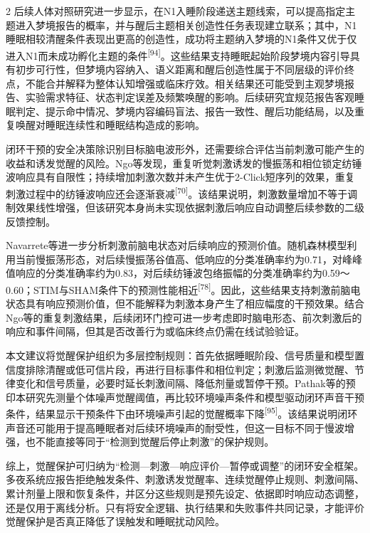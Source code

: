 \documentclass[UTF8,zihao=5,fontset=none]{ctexart}
\newcommand{\hei}{\CJKfamily{hei}}
\newcommand{\leveltwo}[1]{%
  \par\noindent{\hei\fontsize{10.5pt}{15.6pt}\selectfont\bfseries #1\par}}
\newcommand{\refcite}[1]{\nolinebreak[4]\textsuperscript{[#1]}}
\begin{document}
\begin{multicols}{2}
后续人体对照研究进一步显示，在N1入睡阶段递送主题线索，可以提高指定主题进入梦境报告的概率，并与醒后主题相关创造性任务表现建立联系；其中，N1睡眠相较清醒条件表现出更高的创造性，成功将主题纳入梦境的N1条件又优于仅进入N1而未成功孵化主题的条件\refcite{94}。这些结果支持睡眠起始阶段梦境内容引导具有初步可行性，但梦境内容纳入、语义距离和醒后创造性属于不同层级的评价终点，不能合并解释为整体认知增强或临床疗效。相关结果还可能受到主观梦境报告、实验需求特征、状态判定误差及频繁唤醒的影响。后续研究宜规范报告客观睡眠判定、提示命中情况、梦境内容编码盲法、报告一致性、醒后功能结局，以及重复唤醒对睡眠连续性和睡眠结构造成的影响。\par

\leveltwo{4.5 觉醒保护与干预时机自适应策略}

闭环干预的安全决策除识别目标脑电波形外，还需要综合评估当前刺激可能产生的收益和诱发觉醒的风险。Ngo等发现，重复听觉刺激诱发的慢振荡和相位锁定纺锤波响应具有自限性；持续增加刺激次数并未产生优于2-Click短序列的效果，重复刺激过程中的纺锤波响应还会逐渐衰减\refcite{70}。该结果说明，刺激数量增加不等于调制效果线性增强，但该研究本身尚未实现依据刺激后响应自动调整后续参数的二级反馈控制。\par

Navarrete等进一步分析刺激前脑电状态对后续响应的预测价值。随机森林模型利用当前慢振荡形态，对后续慢振荡谷值高、低响应的分类准确率约为0.71，对峰峰值响应的分类准确率约为0.83，对后续纺锤波包络振幅的分类准确率约为0.59～0.60；STIM与SHAM条件下的预测性能相近\refcite{78}。因此，这些结果支持刺激前脑电状态具有响应预测价值，但不能解释为刺激本身产生了相应幅度的干预效果。结合Ngo等的重复刺激结果，后续闭环门控可进一步考虑即时脑电形态、前次刺激后的响应和事件间隔，但其是否改善行为或临床终点仍需在线试验验证。\par

本文建议将觉醒保护组织为多层控制规则：首先依据睡眠阶段、信号质量和模型置信度排除清醒或低可信片段，再进行目标事件和相位判定；刺激后监测微觉醒、节律变化和信号质量，必要时延长刺激间隔、降低剂量或暂停干预。Pathak等的预印本研究先测量个体噪声觉醒阈值，再比较环境噪声条件和模型驱动闭环声音干预条件，结果显示干预条件下由环境噪声引起的觉醒概率下降\refcite{95}。该结果说明闭环声音还可能用于提高睡眠者对后续环境噪声的耐受性，但这一目标不同于慢波增强，也不能直接等同于“检测到觉醒后停止刺激”的保护规则。\par

综上，觉醒保护可归纳为“检测—刺激—响应评价—暂停或调整”的闭环安全框架。多夜系统应报告拒绝触发条件、刺激诱发觉醒率、连续觉醒停止规则、刺激间隔、累计剂量上限和恢复条件，并区分这些规则是预先设定、依据即时响应动态调整，还是仅用于离线分析。只有将安全逻辑、执行结果和失败事件共同记录，才能评价觉醒保护是否真正降低了误触发和睡眠扰动风险。\par


\end{multicols}
\end{document}
